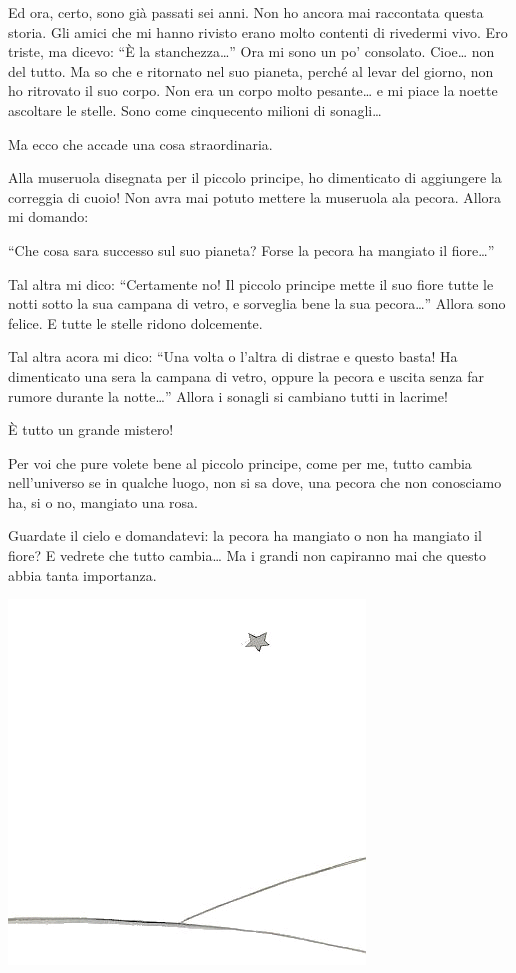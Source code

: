 \documentclass[11pt]{scrbook}
\begin{document}
Ed ora, certo, sono già passati sei anni. Non ho ancora mai raccontata
questa storia. Gli amici che mi hanno rivisto erano molto contenti di
rivedermi vivo. Ero triste, ma dicevo: ``È la stanchezza\ldots{}'' Ora
mi sono un po' consolato. Cioe\ldots{} non del tutto. Ma so che e
ritornato nel suo pianeta, perché al levar del giorno, non ho ritrovato
il suo corpo. Non era un corpo molto pesante\ldots{} e mi piace la
noette ascoltare le stelle. Sono come cinquecento milioni di
sonagli\ldots{}

Ma ecco che accade una cosa straordinaria.

Alla museruola disegnata per il piccolo principe, ho dimenticato di
aggiungere la correggia di cuoio! Non avra mai potuto mettere la
museruola ala pecora. Allora mi domando:

``Che cosa sara successo sul suo pianeta? Forse la pecora ha mangiato il
fiore\ldots{}''

Tal altra mi dico: ``Certamente no! Il piccolo principe mette il suo
fiore tutte le notti sotto la sua campana di vetro, e sorveglia bene la
sua pecora\ldots{}'' Allora sono felice. E tutte le stelle ridono
dolcemente.

Tal altra acora mi dico: ``Una volta o l'altra di distrae e questo
basta! Ha dimenticato una sera la campana di vetro, oppure la pecora e
uscita senza far rumore durante la notte\ldots{}'' Allora i sonagli si
cambiano tutti in lacrime!

È tutto un grande mistero!

Per voi che pure volete bene al piccolo principe, come per me, tutto
cambia nell'universo se in qualche luogo, non si sa dove, una pecora che
non conosciamo ha, si o no, mangiato una rosa.

Guardate il cielo e domandatevi: la pecora ha mangiato o non ha mangiato
il fiore? E vedrete che tutto cambia\ldots{} Ma i grandi non capiranno mai
che questo abbia tanta importanza.

\begin{center}
\includegraphics{./img/27a.png}
\end{center}
\end{document}
